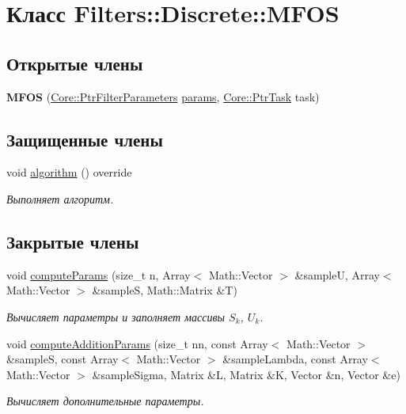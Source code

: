 \hypertarget{class_filters_1_1_discrete_1_1_m_f_o_s}{}\section{Класс Filters\+:\+:Discrete\+:\+:M\+F\+OS}
\label{class_filters_1_1_discrete_1_1_m_f_o_s}
\subsection*{Открытые члены}
\begin{DoxyCompactItemize}
\item 
\hypertarget{class_filters_1_1_discrete_1_1_m_f_o_s_a91cdbd25622c39f50c99f601aad6c238}{}\label{class_filters_1_1_discrete_1_1_m_f_o_s_a91cdbd25622c39f50c99f601aad6c238} 
{\bfseries M\+F\+OS} (\hyperlink{namespace_core_a4811af8148ba137d644b9a61a042cf03}{Core\+::\+Ptr\+Filter\+Parameters} \hyperlink{class_core_1_1_filter_a44aa749b49ba46256975ce545531ecf7}{params}, \hyperlink{namespace_core_abfda8f69fcacfcea2696549b548ed737}{Core\+::\+Ptr\+Task} task)
\end{DoxyCompactItemize}
\subsection*{Защищенные члены}
\begin{DoxyCompactItemize}
\item 
void \hyperlink{class_filters_1_1_discrete_1_1_m_f_o_s_a88e35ad4500d57e81be035959ab9bb5c}{algorithm} () override
\begin{DoxyCompactList}\small\item\em Выполняет алгоритм. \end{DoxyCompactList}\end{DoxyCompactItemize}
\subsection*{Закрытые члены}
\begin{DoxyCompactItemize}
\item 
void \hyperlink{class_filters_1_1_discrete_1_1_m_f_o_s_aa8e5e6ebd6325efc56ef40a2d72303be}{compute\+Params} (size\+\_\+t n, Array$<$ Math\+::\+Vector $>$ \&sampleU, Array$<$ Math\+::\+Vector $>$ \&sampleS, Math\+::\+Matrix \&T)
\begin{DoxyCompactList}\small\item\em Вычисляет параметры и заполняет массивы $S_{k}$, $U_k$. \end{DoxyCompactList}\item 
void \hyperlink{class_filters_1_1_discrete_1_1_m_f_o_s_a23d5c9a20a5eca3b5fd1355359655409}{compute\+Addition\+Params} (size\+\_\+t nn, const Array$<$ Math\+::\+Vector $>$ \&sampleS, const Array$<$ Math\+::\+Vector $>$ \&sample\+Lambda, const Array$<$ Math\+::\+Vector $>$ \&sample\+Sigma, Matrix \&L, Matrix \&K, Vector \&n, Vector \&e)
\begin{DoxyCompactList}\small\item\em Вычисляет дополнительные параметры. \end{DoxyCompactList}\end{DoxyCompactItemize}
